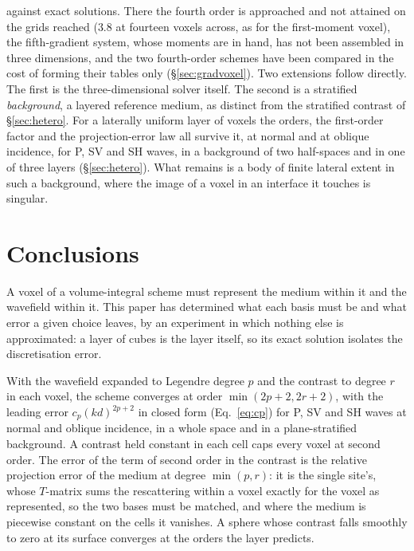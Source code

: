 \documentclass[preprint,review,12pt]{elsarticle}
\begin{document}
against exact solutions. There the fourth order is approached and not attained on the grids reached
($3.8$ at fourteen voxels across, as for the first-moment voxel), the fifth-gradient system, whose
moments are in hand, has not been assembled in three dimensions, and the two fourth-order schemes have
been compared in the cost of forming their tables only (\S\ref{sec:gradvoxel}). Two extensions follow directly. The first is
the three-dimensional solver itself. The second is a stratified \emph{background}, a layered
reference medium, as distinct from the stratified contrast of \S\ref{sec:hetero}. For a
laterally uniform layer of voxels the orders, the first-order factor and the projection-error law all
survive it, at normal and at oblique incidence, for P, SV and SH waves, in a background of two
half-spaces and in one of three layers (\S\ref{sec:hetero}). What remains is a body
of finite lateral extent in such a background, where the image of a voxel in an interface it touches
is singular.

\section{Conclusions}\label{sec:summary}

A voxel of a volume-integral scheme must represent the medium within it and the wavefield within it.
This paper has determined what each basis must be and what error a given choice leaves, by an
experiment in which nothing else is approximated: a layer of cubes is the layer itself, so its exact
solution isolates the discretisation error.

With the wavefield expanded to Legendre degree $p$ and the contrast to degree $r$ in each voxel, the
scheme converges at order $\min(2p+2,2r+2)$, with the leading error $c_p(kd)^{2p+2}$ in closed form
(Eq.~\eqref{eq:cp}) for P, SV and SH waves at normal and oblique incidence, in a whole space and in a
plane-stratified background. A contrast held constant in each cell caps every voxel at second order.
The error of the term of second order in the contrast is the relative projection error of the medium at
degree $\min(p,r)$: it is the single site's, whose $T$-matrix sums the rescattering within a voxel
exactly for the voxel as represented, so the two bases must be matched, and where the medium is
piecewise constant on the cells it vanishes. A sphere whose contrast falls smoothly to zero at its
surface converges at the orders the layer predicts.
\end{document}
